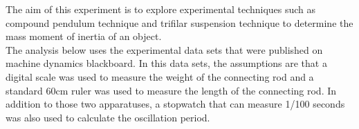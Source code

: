 The aim of this experiment is to explore experimental techniques such as compound pendulum technique and trifilar suspension technique to determine the mass moment of inertia of an object.\\

The analysis below uses the experimental data sets that were published on machine dynamics blackboard. In this data sets, the assumptions are that a digital scale was used to measure the weight of the connecting rod and a standard 60cm ruler was used to measure the length of the connecting rod. In addition to those two apparatuses, a stopwatch that can measure 1/100 seconds was also used to calculate the oscillation period.  \\